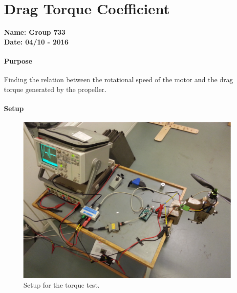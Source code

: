 \chapter{Drag Torque Coefficient}\label{app:TorqueTest} 
\textbf{Name: Group 733}\\
\textbf{Date: 04/10 - 2016}

\subsubsection{Purpose}
Finding the relation between the rotational speed of the motor and the drag torque generated by the propeller.

\subsubsection{Setup}
\begin{figure}[H]
	\centering
	\includegraphics[scale=0.06]{figures/TorqueTestSetup}
	\caption{Setup for the torque test.}
	\label{TorqueTest}
\end{figure}

